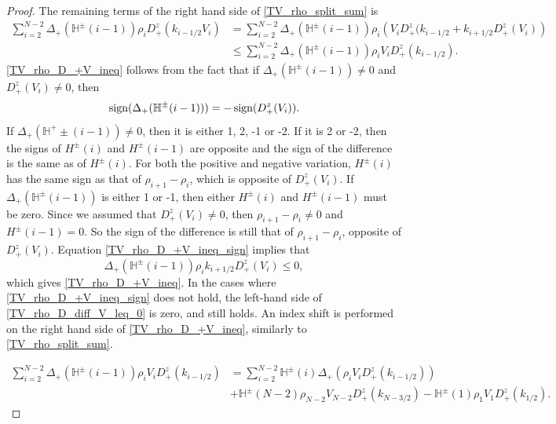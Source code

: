 \begin{proof}
 	The remaining terms of the right hand side of \eqref{TV_rho_split_sum} is
 	\begin{align}
 		\sum_{i = 2}^{N-2} \Delta_+(\mathbb{H}^\pm(i-1)) \rho_{i} D_+^z(k_{i-1/2}V_{i}) &= \sum_{i = 2}^{N-2} \Delta_+(\mathbb{H}^\pm(i-1)) \rho_{i} \left(V_i D_+^z(k_{i-1/2} + k_{i+1/2}D_+^z(V_{i})\right) \nonumber \\
 		&\leq \sum_{i = 2}^{N-2} \Delta_+(\mathbb{H}^\pm(i-1)) \rho_{i} V_i D_+^z(k_{i-1/2}). \label{TV_rho_D_+V_ineq}
 	\end{align}
 	\eqref{TV_rho_D_+V_ineq} follows from the fact that if $\Delta_+(\mathbb{H}^\pm(i-1)) \neq 0$ and $D_+^z(V_{i}) \neq 0$, then 
 	\begin{equation}
 		\operatorname{sign}(\Delta_+(\mathbb{H}^\pm(i-1))) = - \operatorname{sign}(D_+^z(V_{i})). \label{TV_rho_D_+V_ineq_sign}
 	\end{equation}
 	If $\Delta_+(\mathbb{H}^+\pm(i-1)) \neq 0$, then it is either 1, 2, -1 or -2. If it is 2 or -2, then the signs of $H^\pm(i)$ and $H^\pm(i-1)$ are opposite and the sign of the difference is the same as of $H^\pm(i)$. For both the positive and negative variation, $H^\pm(i)$ has the same sign as that of $\rho_{i+1} - \rho_i$, which is opposite of $D_+^z(V_{i})$. If $\Delta_+(\mathbb{H}^\pm(i-1))$ is either 1 or -1, then either $H^\pm(i)$ and $H^\pm(i-1)$ must be zero. Since we assumed that $D_+^z(V_{i}) \neq 0$, then $\rho_{i+1} - \rho_i \neq 0$ and $H^\pm(i-1) = 0$. So the sign of the difference is still that of $\rho_{i+1} - \rho_i$, opposite of $D_+^z(V_{i})$. 
 	Equation \eqref{TV_rho_D_+V_ineq_sign} implies that 
 	\begin{equation} \label{TV_rho_D_diff_V_leq_0}
 		\Delta_+(\mathbb{H}^\pm(i-1)) \rho_{i}k_{i+1/2}D_+^z(V_{i}) \leq 0, 
 	\end{equation}
 	which gives \eqref{TV_rho_D_+V_ineq}. In the cases where \eqref{TV_rho_D_+V_ineq_sign} does not hold, the left-hand side of \eqref{TV_rho_D_diff_V_leq_0} is zero, and still holds. An index shift is performed on the right hand side of \eqref{TV_rho_D_+V_ineq}, similarly to \eqref{TV_rho_split_sum}. 
 	
 	\begin{align}
 		\sum_{i = 2}^{N-2} \Delta_+(\mathbb{H}^\pm(i-1)) \rho_{i} V_i D_+^z(k_{i-1/2}) &= \sum_{i = 2}^{N-2} \mathbb{H}^\pm(i) \Delta_+(\rho_{i} V_i D_+^z(k_{i-1/2})) \\
 		&+ \mathbb{H}^\pm(N-2) \rho_{N-2} V_{N-2} D_+^z(k_{N-3/2}) - \mathbb{H}^\pm(1) \rho_{1} V_{1} D_+^z(k_{1/2}). \label{TV_rho_split_sum_2}
 	\end{align}
 

\end{proof}
